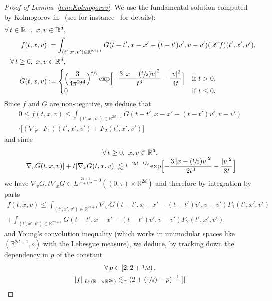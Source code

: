 \documentclass[11pt]{article}
\numberwithin{equation}{section}\let\oldbigcup\bigcup
\let\mathcal\mathscr
\newcommand{\Psfrac}[2]{(\sfrac{#1}{#2})}
\theoremstyle{definition}
\theoremstyle{remark}
\newcommand\R{{\mathbb R}}
\newcommand{\cK}{\mathcal K}
\begin{document}
\begin{proof}[Proof of Lemma~\ref{lem:Kolmogorov}]
We use the fundamental solution computed by Kolmogorov
in~\cite{kolmogorov} (see for
instance~\cite[App.\,A]{MR4113786} for details):
\begin{align*}
\forall \, t \in \R_-, \ x,v &\in \R^d, \\
f(t,x,v) &\phantom{:}=\int_{(t',x',v')\in \R^{2d+1}} G(t-t', x-x'
-(t-t')v',v-v') (\cK f)(t',x',v'), \\
\forall \, t \ge 0, \ x,v &\in \R^d, \\
G(t,x,v) &:=
\begin{dcases}
\Bigl( \frac{3}{4\pi^2 t^4} \Bigr)^{\sfrac{d}{2}}
\exp \Bigl[ - \frac{3 \left| x - \Psfrac{t}{2} v
\right|^2}{t^3} - \frac{|v|^2}{4t} \Bigr] & \text{if } t>0,\\
0 & \text{if } t\leq 0.
\end{dcases}
\end{align*}
Since $f$ and $G$ are non-negative, we deduce that
\begin{multline*}
0 \le f(t,x,v) \le\int_{(t',x',v')\in \R^{2d+1}} G(t-t', x-x'-(t-t')v',v-v')\\
\cdot\bigl[(\nabla_{v'} \cdot F_1) (t',x',v')+ F_2 (t',x',v') \bigr]
\end{multline*}
and since
\begin{multline*}
\forall \, t \ge 0, \ x,v \in \R^d, \\[-5pt]
|\nabla_v G(t,x,v)| +t |\nabla_x G(t,x,v)|
\lesssim t^{-2d-\sfrac12}
\exp \Bigl[ - \frac{3 \left| x - \Psfrac{t}{2} v
\right|^2}{2t^3} - \frac{|v|^2}{8t} \Bigr]
\end{multline*}
we have
$\nabla_v G, t \nabla_x G \in L^{\frac{2d+1}{2d+1/2}-0}
(\left(0,\tau\right) \times \R^{2d})$ and therefore by
integration by parts
\begin{multline*}
f(t,x,v) \le \int_{(t',x',v')\in \R^{2d+1}}
\nabla_{v'} G(t-t',x-x'-(t-t')v',v-v') F_1(t',x',v')\\
+ \int_{(t',x',v') \in \R^{2d+1}}
G(t-t',x-x'-(t-t')v',v-v') F_2(t',x',v')
\end{multline*}
and Young's convolution inequality (which works in unimodular
spaces like $(\R^{2d+1},\circ)$ with the Lebesgue measure), we
deduce, by tracking down the dependency in $p$ of the constant
\begin{multline*}
\forall \, p \in \left[2,2+\sfrac1d\right), \\
\| f \|_{L^{p}(\R_- \times \R^{2d})}\lesssim_\tau \left( 2+ \Psfrac1d - p \right)^{-1} \bigl[ \|

\end{multline*}
\end{proof}
\end{document}
